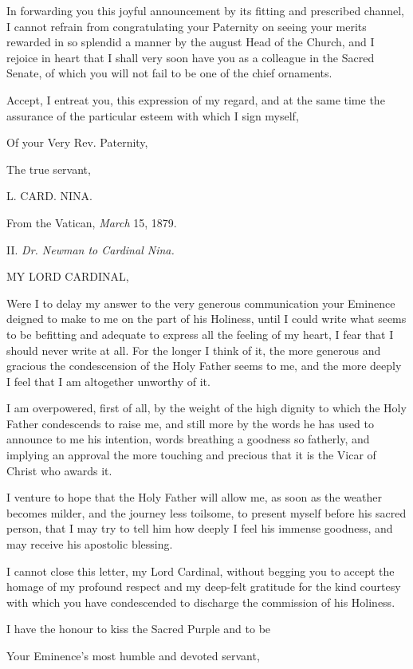 In forwarding you this joyful announcement by its fitting and
prescribed channel, I cannot refrain from congratulating your
Paternity on seeing your merits rewarded in so splendid a manner by
the august Head of the Church, and I rejoice in heart that I shall
very soon have you as a colleague in the Sacred Senate, of which you
will not fail to be one of the chief ornaments.

Accept, I entreat you, this expression of my regard, and at the
same time the assurance of the particular esteem with which I sign
myself,

Of your Very Rev. Paternity,

The true servant,

L. CARD. NINA.

From the Vatican, \emph{March} 15, 1879.

II.
\emph{Dr. Newman to Cardinal Nina.}

MY LORD CARDINAL,

Were I to delay my answer to the very generous communication your
Eminence deigned to make to me on the part of his Holiness, until I
could write what seems to be befitting and adequate to express all the
feeling of my heart, I fear that I should never write at all. For the
longer I think of it, the more generous and gracious the condescension
of the Holy Father seems to me, and the more deeply I feel that I am
altogether unworthy of it.

I am overpowered, first of all, by the weight of the high dignity
to which the Holy Father condescends to raise me, and still more by
the words he has used to announce to me his intention, words breathing
a goodness so fatherly, and implying an approval the more touching and
precious that it is the Vicar of Christ who awards it.

I venture to hope that the Holy Father will allow me, as soon as
the weather becomes milder, and the journey less toilsome, to present
myself before his sacred person, that I may try to tell him how deeply
I feel his immense goodness, and may receive his apostolic blessing.

I cannot close this letter, my Lord Cardinal, without begging you
to accept the homage of my profound respect and my deep-felt gratitude
for the kind courtesy with which you have condescended to discharge
the commission of his Holiness.

I have the honour to kiss the Sacred Purple and to be

Your Eminence's most humble and devoted servant,

